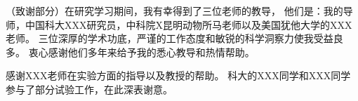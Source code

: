 
\begin{acknowledgements}

（致谢部分）在研究学习期间，我有幸得到了三位老师的教导，
他们是：我的导师，中国科大XXX研究员，中科院X昆明动物所马老师以及美国犹他大学的XXX老师。
三位深厚的学术功底，严谨的工作态度和敏锐的科学洞察力使我受益良多。
衷心感谢他们多年来给予我的悉心教导和热情帮助。

感谢XXX老师在实验方面的指导以及教授的帮助。
科大的XXX同学和XXX同学参与了部分试验工作，在此深表谢意。

\end{acknowledgements}
